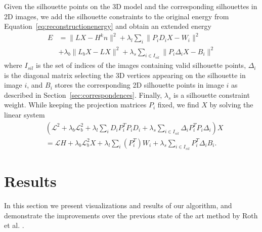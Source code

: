 Given the silhouette points on the 3D model and the corresponding silhouettes in 2D images, we add the silhouette constraints to the original energy from Equation~\ref{eq:reconstructionenergy} and obtain an extended energy
%
\begin{equation}
\begin{split}
E&=\|LX - H^{k}n\|^2+ \lambda_{l}\sum_{i}{\|P_{i}D_{i}X-W_{i}\|^2} \\
&+\lambda_{b}\|L_{b}X - LX\|^2+\lambda_{s} \sum_{i\in I_{sil}}{\|P_{i}\Delta_{i}X-B_{i}\|^2}
\end{split}
\end{equation} 
%
where $I_{sil}$ is the set of indices of the images containing valid silhouette points, $\Delta_{i}$ is the diagonal matrix selecting the 3D vertices appearing on the silhouette in image $i$, and $B_i$ stores the corresponding 2D silhouette points in image $i$ as described in Section~\ref{sec:correspondences}. Finally, $\lambda_{s}$ is a silhouette constraint weight.
While keeping the projection matrices $P_i$ fixed, we find $X$ by solving the linear system
%
\begin{equation}
\begin{split}
&(\mathcal{L}^2+\lambda_{b}\mathcal{L}_b^2 +\lambda_{l}\sum_{i}{D_{i}P_{i}^{T}P_{i}D_{i}}+\lambda_{s} \sum_{i \in I_{sil}}{\Delta_{i}P_{i}^{T}P_{i}\Delta_{i}})X\\
&=\mathcal{L}H+\lambda_{b}\mathcal{L}_b^2X+\lambda_{l}\sum_{i}{(P_{i}^T)W_{i}}+\lambda_{s}\sum_{i \in I_{sil}}{P_{i}^{T}\Delta_{i}B_{i}}.
\end{split}
\end{equation} 



\section{Results}
\label{sec:results}

In this section we present visualizations and results of our algorithm, and demonstrate the improvements over the previous state of the art method by Roth et al. \cite{Roth:2015:UFR}.

